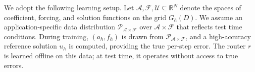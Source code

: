 \documentclass{article}
\newcommand{\ambuj}[1]{\textcolor{red}{AT: #1}}
\begin{document}
We adopt the following learning setup. Let $\mathcal{A}, \mathcal{F}, \mathcal{U} \subseteq \mathbb{R}^N$ denote the spaces of coefficient, forcing, and solution functions on the grid $G_h(D)$. We assume an application-specific data distribution $\mathcal{P}_{\mathcal{A} \times \mathcal{F}}$ over $\mathcal{A} \times \mathcal{F}$ that reflects test time conditions.
During training, $(a_h, f_h)$ is drawn from $\mathcal{P}_{\mathcal{A} \times \mathcal{F}}$, and a high-accuracy reference solution $u_h$ is computed, providing the true per-step error. The router $r$ is learned offline on this data; at test time, it operates without access to true errors.

\end{document}
